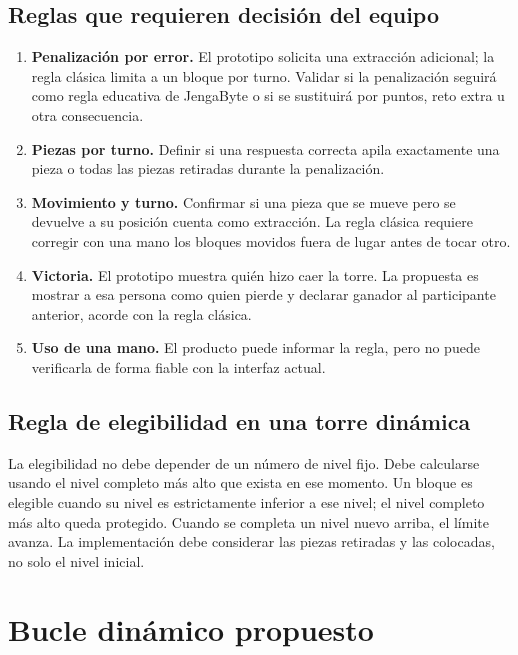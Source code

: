 \documentclass[11pt,letterpaper]{article}
\begin{document}
\subsection{Reglas que requieren decisión del equipo}
\begin{enumerate}
  \item \textbf{Penalización por error.} El prototipo solicita una extracción adicional; la regla clásica limita a un bloque por turno. Validar si la penalización seguirá como regla educativa de JengaByte o si se sustituirá por puntos, reto extra u otra consecuencia.
  \item \textbf{Piezas por turno.} Definir si una respuesta correcta apila exactamente una pieza o todas las piezas retiradas durante la penalización.
  \item \textbf{Movimiento y turno.} Confirmar si una pieza que se mueve pero se devuelve a su posición cuenta como extracción. La regla clásica requiere corregir con una mano los bloques movidos fuera de lugar antes de tocar otro.
  \item \textbf{Victoria.} El prototipo muestra quién hizo caer la torre. La propuesta es mostrar a esa persona como quien pierde y declarar ganador al participante anterior, acorde con la regla clásica.
  \item \textbf{Uso de una mano.} El producto puede informar la regla, pero no puede verificarla de forma fiable con la interfaz actual.
\end{enumerate}

\subsection{Regla de elegibilidad en una torre dinámica}
La elegibilidad no debe depender de un número de nivel fijo. Debe calcularse usando el nivel completo más alto que exista en ese momento. Un bloque es elegible cuando su nivel es estrictamente inferior a ese nivel; el nivel completo más alto queda protegido. Cuando se completa un nivel nuevo arriba, el límite avanza. La implementación debe considerar las piezas retiradas y las colocadas, no solo el nivel inicial.

\section{Bucle dinámico propuesto}
\end{document}
